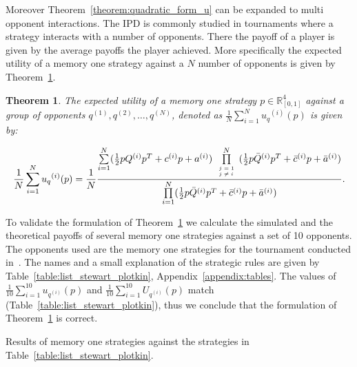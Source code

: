 \documentclass[10pt]{article}
\newtheorem{theorem}{Theorem}
\begin{document}
Moreover Theorem~\ref{theorem:quadratic_form_u} can be expanded to multi opponent
interactions. The IPD is commonly studied in tournaments where a strategy interacts
with a number of opponents. There the payoff of a player is given by the average
payoffs the player achieved. More specifically the expected utility of a memory one strategy
against a \(N\) number of opponents is given by Theorem~\ref{theorem:tournament_utility}.

\begin{theorem}\label{theorem:tournament_utility}
    The expected utility of a memory one strategy \(p\in\mathbb{R}_{[0,1]}^4\)
    against a group of opponents \(q^{(1)}, q^{(2)}, \dots, q^{(N)}\), denoted
    as \(\frac{1}{N} \sum\limits_{i=1} ^ {N} {u_q}^{(i)} (p)\) is given by:

    \begin{equation}\label{eq:tournament_utility}
        \frac{1}{N} \sum\limits_{i=1} ^ {N} {u_q}^{(i)} (p) = \frac{1}{N}
        \frac{\sum\limits_{i=1} ^ {N} (\frac{1}{2} pQ^{(i)} p^T + c^{(i)} p + a^ {(i)})
        \prod\limits_{\tiny\begin{array}{l} j=1 \\ j \neq i \end{array}} ^
        N (\frac{1}{2} p\bar{Q}^{(i)} p^T + \bar{c}^{(i)} p + \bar{a}^ {(i)})}
        {\prod\limits_{i=1} ^ N (\frac{1}{2} p\bar{Q}^{(i)} p^T + \bar{c}^{(i)} p + \bar{a}^ {(i)})}.
    \end{equation}

\end{theorem}

To validate the formulation of Theorem~\ref{theorem:tournament_utility} we calculate
the simulated and the theoretical payoffs of several memory one strategies against
a set of 10 opponents. The opponents used are the memory one strategies for the tournament
conducted in~\cite{Stewart2012}. The names and a small explanation of the strategic rules are
given by Table~\ref{table:list_stewart_plotkin}, Appendix~\ref{appendix:tables}.
The values of \(\frac{1}{10} \sum\limits_{i=1} ^ {10} u_{q ^{(i)}} (p)\) and
\(\frac{1}{10} \sum\limits_{i=1} ^ {10} U_{q ^{(i)}} (p)\) match (Table~\ref{table:list_stewart_plotkin}),
thus we conclude that the formulation of Theorem~\ref{theorem:tournament_utility} is correct.

\begin{table}[htbp]
    \begin{center}
    
    \end{center}
    \caption{Results of memory one strategies against the strategies in Table~\ref{table:list_stewart_plotkin}.}
    \label{table:list_stewart_plotkin}
\end{table}
\end{document}
